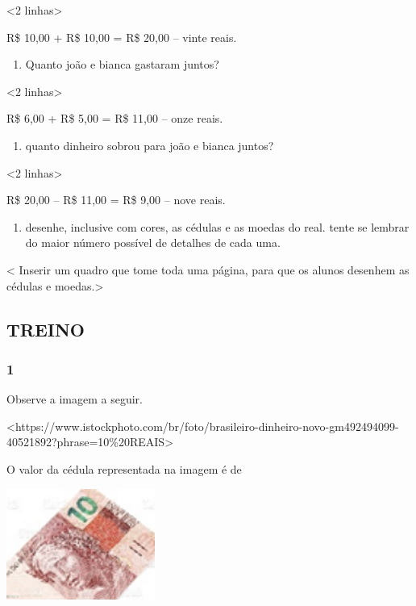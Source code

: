 \textless{}2 linhas\textgreater{}

R\$ 10,00 + R\$ 10,00 = R\$ 20,00 -- vinte reais.

\begin{enumerate}
\def\labelenumi{\Alph{enumi})}
\item
  Quanto joão e bianca gastaram juntos?
\end{enumerate}

\textless{}2 linhas\textgreater{}

R\$ 6,00 + R\$ 5,00 = R\$ 11,00 -- onze reais.

\begin{enumerate}
\def\labelenumi{\Alph{enumi})}
\item
  quanto dinheiro sobrou para joão e bianca juntos?
\end{enumerate}

\textless{}2 linhas\textgreater{}

R\$ 20,00 -- R\$ 11,00 = R\$ 9,00 -- nove reais.

\begin{enumerate}
\def\labelenumi{\arabic{enumi}.}
\item
  desenhe, inclusive com cores, as cédulas e as moedas do real. tente se lembrar do maior número possível de detalhes de cada uma.
\end{enumerate}

\textless{} Inserir um quadro que tome toda uma página, para que os
alunos desenhem as cédulas e moedas.\textgreater{}


\subsection{TREINO}\label{treino-4}

\subsubsection{1}\label{section-60}

Observe a imagem a seguir.

\textless{}https://www.istockphoto.com/br/foto/brasileiro-dinheiro-novo-gm492494099-40521892?phrase=10\%20REAIS\textgreater{}

O valor da cédula representada na imagem é de

\includegraphics[width=1.92157in,height=1.43284in]{media/image75.png}

